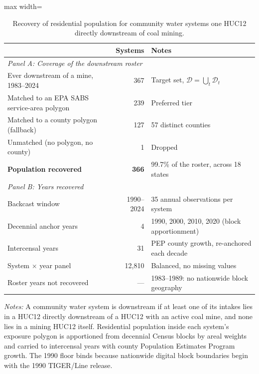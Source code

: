 \begin{table}[ht]
\centering
\caption{Recovery of residential population for community water systems one HUC12 directly downstream of coal mining.}
\label{tab:backcast_recovery}
\begin{adjustbox}{max width=\textwidth}
\begin{tabular}{lrl}
\toprule
& Systems & Notes \\
\midrule
\multicolumn{3}{l}{\textit{Panel A: Coverage of the downstream roster}} \\
Ever downstream of a mine, 1983--2024 & 367 & Target set, $\mathcal{D}=\bigcup_t \mathcal{D}_t$ \\
\quad Matched to an EPA SABS service-area polygon & 239 & Preferred tier \\
\quad Matched to a county polygon (fallback) & 127 & 57 distinct counties \\
\quad Unmatched (no polygon, no county) & 1 & Dropped \\
\textbf{Population recovered} & \textbf{366} & 99.7\% of the roster, across 18 states \\
\midrule
\multicolumn{3}{l}{\textit{Panel B: Years recovered}} \\
Backcast window & 1990--2024 & 35 annual observations per system \\
\quad Decennial anchor years & 4 & 1990, 2000, 2010, 2020 (block apportionment) \\
\quad Intercensal years & 31 & PEP county growth, re-anchored each decade \\
System $\times$ year panel & 12,810 & Balanced, no missing values \\
Roster years not recovered & --- & 1983--1989: no nationwide block geography \\
\bottomrule
\end{tabular}
\end{adjustbox}
\begin{minipage}{\textwidth}\footnotesize\raggedright
\vspace{0.5em}
\textit{Notes:} A community water system is downstream if at least one of its intakes lies in a HUC12 directly downstream of a HUC12 with an active coal mine, and none lies in a mining HUC12 itself. Residential population inside each system's exposure polygon is apportioned from decennial Census blocks by areal weights and carried to intercensal years with county Population Estimates Program growth. The 1990 floor binds because nationwide digital block boundaries begin with the 1990 TIGER/Line release.
\end{minipage}
\end{table}
